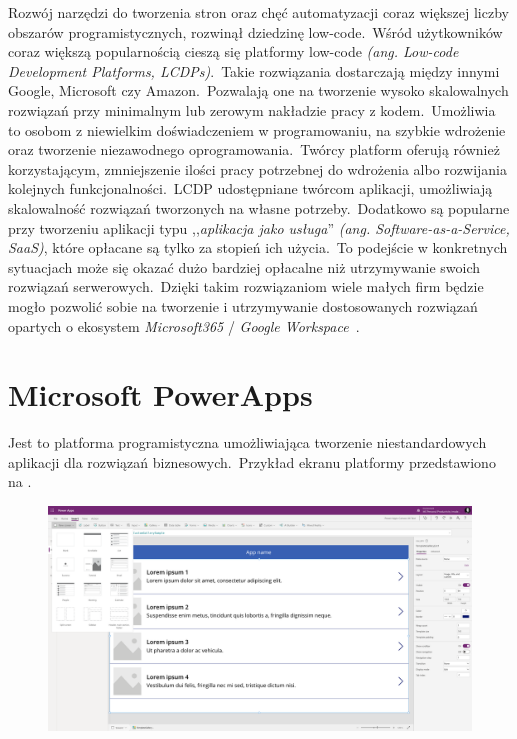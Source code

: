Rozwój narzędzi do tworzenia stron oraz chęć automatyzacji coraz większej liczby obszarów programistycznych, rozwinął dziedzinę low-code.\ Wśród użytkowników coraz większą popularnością cieszą się platformy low-code \textit{(ang. Low-code Development Platforms, LCDPs)}.\ Takie rozwiązania dostarczają między innymi Google, Microsoft czy Amazon.\ Pozwalają one na tworzenie wysoko skalowalnych rozwiązań przy minimalnym lub zerowym nakładzie pracy z kodem.\ Umożliwia to osobom z niewielkim doświadczeniem w programowaniu, na szybkie wdrożenie oraz tworzenie niezawodnego oprogramowania.\ Twórcy platform oferują również korzystającym, zmniejszenie ilości pracy potrzebnej do wdrożenia albo rozwijania kolejnych funkcjonalności.\ LCDP udostępniane twórcom aplikacji, umożliwiają skalowalność rozwiązań tworzonych na własne potrzeby.\ Dodatkowo są popularne przy tworzeniu aplikacji typu ,,\textit{aplikacja jako usługa}'' \textit{(ang. Software-as-a-Service, SaaS)}, które opłacane są tylko za stopień ich użycia.\ To podejście w konkretnych sytuacjach może się okazać dużo bardziej opłacalne niż utrzymywanie swoich rozwiązań serwerowych.\ Dzięki takim rozwiązaniom wiele małych firm będzie mogło pozwolić sobie na tworzenie i utrzymywanie dostosowanych rozwiązań opartych o ekosystem \textit{Microsoft365} / \textit{Google Workspace}~\cite{Bock2021,Hirzel2022}.


\section{Microsoft PowerApps}
Jest to platforma programistyczna umożliwiająca tworzenie niestandardowych aplikacji dla rozwiązań biznesowych.\ Przykład ekranu platformy przedstawiono na .

\begin{figure}[H]
    \centering
    \includegraphics[width=\textwidth]{images/ms_powerapps}
    \label{fig:pa-plat}
\end{figure}


